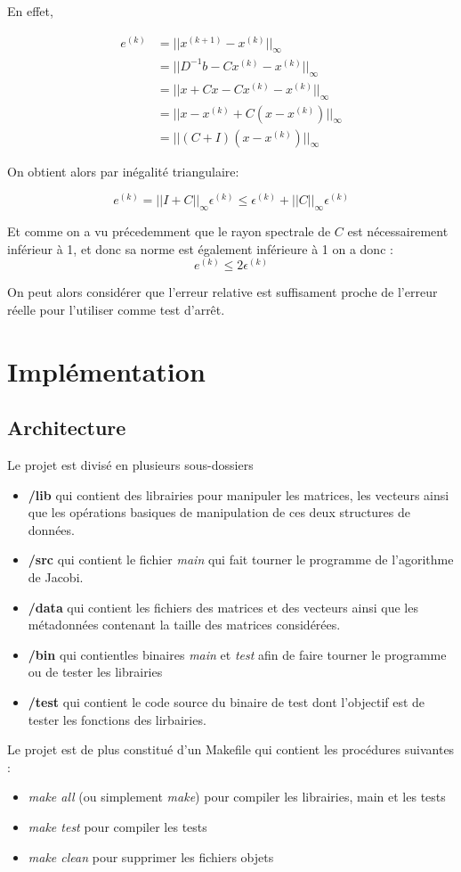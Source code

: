 \documentclass[11pt, a4paper]{article}
\begin{document}
En effet, 

\begin{align}
    e^{(k)} &= ||x^{(k+1)} - x^{(k)}||_{\infty}\\
    &= ||D^{-1}b - Cx^{(k)} - x^{(k)}||_{\infty}\\
    &= ||x + Cx - Cx^{(k)} - x^{(k)}||_{\infty}\\
    &= ||x - x^{(k)} + C(x - x^{(k)})||_{\infty}\\
    &= ||(C + I)(x - x^{(k)})||_{\infty}
\end{align}

On obtient alors par inégalité triangulaire: 

\[
e^{(k)} = ||I + C||_{\infty}\epsilon^{(k)} \leq \epsilon^{(k)} + ||C||_{\infty}\epsilon^{(k)}
\]

Et comme on a vu précedemment que le rayon spectrale de $C$ est nécessairement inférieur à 1, et donc sa norme est également inférieure à 1 on a donc :
\[
e^{(k)} \leq 2\epsilon^{(k)}
\]

On peut alors considérer que l'erreur relative est suffisament proche de l'erreur réelle pour l'utiliser comme test d'arr\^et.

\newpage

\section{Implémentation}

\subsection{Architecture}

Le projet est divisé en plusieurs sous-dossiers
\begin{itemize}
    \item \textbf{/lib} qui contient des librairies pour manipuler les matrices, les vecteurs ainsi que les opérations basiques de manipulation de ces deux structures de données.
    \item \textbf{/src} qui contient le fichier \textit{main} qui fait tourner le programme de l'agorithme de Jacobi.
    \item \textbf{/data} qui contient les fichiers des matrices et des vecteurs ainsi que les métadonnées contenant la taille des matrices considérées.
    \item \textbf{/bin} qui contientles binaires \textit{main} et \textit{test} afin de faire tourner le programme ou de tester les librairies
    \item \textbf{/test} qui contient le code source du binaire de test dont l'objectif est de tester les fonctions des lirbairies.
\end{itemize}
Le projet est de plus constitué d'un Makefile qui contient les procédures suivantes :
\begin{itemize}
    \item \textit{make all} (ou simplement \textit{make}) pour compiler les librairies, main et les tests 
    \item \textit{make test} pour compiler les tests 
    \item \textit{make clean} pour supprimer les fichiers objets
\end{itemize}
\end{document}
